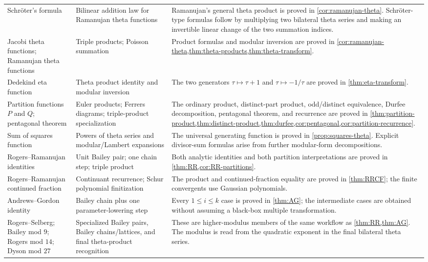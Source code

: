 \documentclass[11pt]{article}
\theoremstyle{blueplain}
\theoremstyle{bluedef}
\begin{document}
\begin{longtable}{@{}p{}p{}p{}@{}}
Schr\"oter's formula
& Bilinear addition law for Ramanujan theta functions
& Ramanujan's general theta product is proved in \cref{cor:ramanujan-theta}.  Schr\"oter-type formulas follow by multiplying two bilateral theta series and making an invertible linear change of the two summation indices.\\[0.4em]
Jacobi theta functions; Ramanujan theta functions
& Triple products; Poisson summation
& Product formulas and modular inversion are proved in \cref{cor:ramanujan-theta,thm:theta-products,thm:theta-transform}.\\[0.4em]
Dedekind eta function
& Theta product identity and modular inversion
& The two generators $\tau\mapsto\tau+1$ and $\tau\mapsto-1/\tau$ are proved in \cref{thm:eta-transform}.\\[0.4em]
Partition functions $P$ and $Q$; pentagonal theorem
& Euler products; Ferrers diagrams; triple-product specialization
& The ordinary product, distinct-part product, odd/distinct equivalence, Durfee decomposition, pentagonal theorem, and recurrence are proved in \cref{thm:partition-product,thm:distinct-product,thm:durfee,cor:pentagonal,cor:partition-recurrence}.\\[0.4em]
Sum of squares function
& Powers of theta series and modular/Lambert expansions
& The universal generating function is proved in \cref{prop:squares-theta}.  Explicit divisor-sum formulas arise from further modular-form decompositions.\\[0.4em]
Rogers--Ramanujan identities
& Unit Bailey pair; one chain step; triple product
& Both analytic identities and both partition interpretations are proved in \cref{thm:RR,cor:RR-partitions}.\\[0.4em]
Rogers--Ramanujan continued fraction
& Continuant recurrence; Schur polynomial finitization
& The product and continued-fraction equality are proved in \cref{thm:RRCF}; the finite convergents use Gaussian polynomials.\\[0.4em]
Andrews--Gordon identity
& Bailey chain plus one parameter-lowering step
& Every $1\le i\le k$ case is proved in \cref{thm:AG}; the intermediate cases are obtained without assuming a black-box multiple transformation.\\[0.4em]
Rogers--Selberg; Bailey mod $9$; Rogers mod $14$; Dyson mod $27$
& Specialized Bailey pairs, Bailey chains/lattices, and final theta-product recognition
& These are higher-modulus members of the same workflow as \cref{thm:RR,thm:AG}.  The modulus is read from the quadratic exponent in the final bilateral theta series.\\[0.4em]

\end{longtable}
\end{document}
